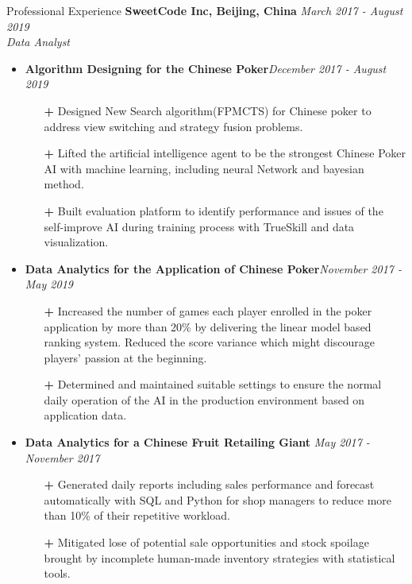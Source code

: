 \documentclass{resume} %
\begin{document}
\begin{rSection}{Professional Experience}
{\bf SweetCode Inc, Beijing, China} \hfill {\em March 2017 - August 2019}
\\ {\em  {Data Analyst}}
\begin{itemize}
\setlength{\topsep}{-0.1in}
\setlength{\itemindent}{-0.1in}
\setlength{\parskip}{0.5pt}

    \item {\bf Algorithm Designing for the Chinese Poker}\hfill{\em December 2017 - August 2019}
    \begin{itemize}
    \setlength{\parskip}{0.3pt}
        \item[\textbf{+}] Designed New Search algorithm(FPMCTS) for Chinese poker to address view switching and strategy fusion problems.
        \item[\textbf{+}] Lifted the artificial intelligence agent to be the strongest Chinese Poker AI with machine learning, including neural Network and bayesian method.
        \item[\textbf{+}] Built evaluation platform to identify performance and issues of the self-improve AI during training process with TrueSkill and data visualization.
    \end{itemize}

    \item {\bf Data Analytics for the Application of Chinese Poker}\hfill{\em November 2017 - May 2019}
    \begin{itemize}
        \item[\textbf{+}]
        Increased the number of games each player enrolled in the poker application by more than 20\% by delivering the linear model based ranking system. Reduced the score variance which might discourage players' passion at the beginning.
        \item[\textbf{+}] Determined and maintained suitable settings to ensure the normal daily operation of the AI in the production environment based on application data.
    \end{itemize}

    \item {\bf Data Analytics for a Chinese Fruit Retailing Giant} \hfill{\em May 2017 - November 2017}
    \begin{itemize}
    \setlength{\parskip}{0.2pt}
    \item[\textbf{+}] Generated daily reports including sales performance and forecast automatically with SQL and Python for shop managers to reduce more than 10\% of their repetitive workload.
    \item[\textbf{+}] Mitigated lose of potential sale opportunities and stock spoilage brought by incomplete human-made inventory strategies with statistical tools.
    \end{itemize}

\end{itemize}
\end{rSection}
\end{document}
